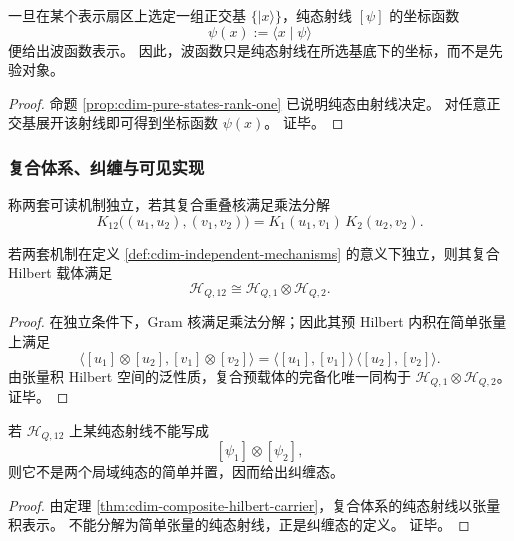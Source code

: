\begin{corollary}[波函数只是坐标表示]\label{cor:cdim-wavefunction-as-coordinate}
一旦在某个表示扇区上选定一组正交基 \(\{\lvert x\rangle\}\)，纯态射线 \([\psi]\) 的坐标函数
\[
\psi(x):=\langle x\mid\psi\rangle
\]
便给出波函数表示。
因此，波函数只是纯态射线在所选基底下的坐标，而不是先验对象。
\end{corollary}
\begin{proof}
命题 \ref{prop:cdim-pure-states-rank-one} 已说明纯态由射线决定。
对任意正交基展开该射线即可得到坐标函数 \(\psi(x)\)。
证毕。
\end{proof}

\subsubsection{复合体系、纠缠与可见实现}
\begin{definition}[独立机制]\label{def:cdim-independent-mechanisms}
称两套可读机制独立，若其复合重叠核满足乘法分解
\[
K_{12}\bigl((u_1,u_2),(v_1,v_2)\bigr)
=
K_1(u_1,v_1)\,K_2(u_2,v_2).
\]
\end{definition}

\begin{theorem}[复合 Hilbert 载体]\label{thm:cdim-composite-hilbert-carrier}
若两套机制在定义 \ref{def:cdim-independent-mechanisms} 的意义下独立，则其复合 Hilbert 载体满足
\[
\mathcal H_{Q,12}\cong \mathcal H_{Q,1}\otimes\mathcal H_{Q,2}.
\]
\end{theorem}
\begin{proof}
在独立条件下，Gram 核满足乘法分解；因此其预 Hilbert 内积在简单张量上满足
\[
\langle [u_1]\otimes [u_2], [v_1]\otimes [v_2]\rangle
=
\langle [u_1],[v_1]\rangle\,\langle [u_2],[v_2]\rangle.
\]
由张量积 Hilbert 空间的泛性质，复合预载体的完备化唯一同构于
\(
\mathcal H_{Q,1}\otimes\mathcal H_{Q,2}
\)。
证毕。
\end{proof}

\begin{corollary}[纠缠]\label{cor:cdim-entanglement}
若 \(\mathcal H_{Q,12}\) 上某纯态射线不能写成
\[
[\psi_1]\otimes[\psi_2],
\]
则它不是两个局域纯态的简单并置，因而给出纠缠态。
\end{corollary}
\begin{proof}
由定理 \ref{thm:cdim-composite-hilbert-carrier}，复合体系的纯态射线以张量积表示。
不能分解为简单张量的纯态射线，正是纠缠态的定义。
证毕。
\end{proof}

